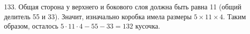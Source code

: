 133. Общая сторона у верхнего и бокового слоя должна быть равна 11 (общий делитель 55 и 33). Значит, изначально коробка имела размеры $5\times11\times4.$ Таким образом, осталось $5\cdot11\cdot4-55-33=132$ кусочка.\\
